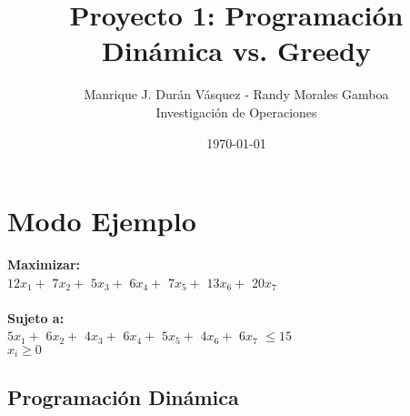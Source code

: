 \documentclass[12pt]{article}
\title{Proyecto 1: Programaci\'on Din\'amica vs. Greedy}
\author{Manrique J. Dur\'an V\'asquez - Randy Morales Gamboa\\Investigaci\'on de Operaciones\\}
\date{\today}
\newcommand\tab[1][1cm]{\hspace*{#1}}
\begin{document}
\maketitle
\pagebreak

\section*{Modo Ejemplo}

\textbf{Maximizar:} \\
\tab$12x_{1} + $ $7x_{2} + $ $5x_{3} + $ $6x_{4} + $ $7x_{5} + $ $13x_{6} + $ $20x_{7}   $ \\\\
\textbf{Sujeto a:}\\
\tab$5x_{1} + $ $6x_{2} + $ $4x_{3} + $ $6x_{4} + $ $5x_{5} + $ $4x_{6} + $ $6x_{7}   $ $\leq 15$\\
\tab$x_i \geq 0$\subsection*{Programaci\'on Din\'amica}
\end{document}
